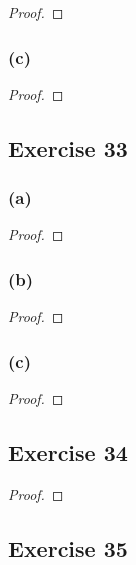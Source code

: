 \documentclass[14pt]{extarticle}
\begin{document}
\begin{proof}

\end{proof}

\subsubsection{(c)}

\begin{proof}

\end{proof}

\subsection{Exercise 33}

\subsubsection{(a)}

\begin{proof}

\end{proof}

\subsubsection{(b)}

\begin{proof}

\end{proof}

\subsubsection{(c)}

\begin{proof}

\end{proof}

\subsection{Exercise 34}

\begin{proof}

\end{proof}

\subsection{Exercise 35}
\end{document}
